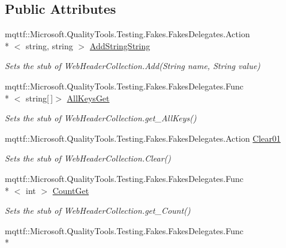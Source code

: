\subsection*{Public Attributes}
\begin{DoxyCompactItemize}
\item 
mqttf\-::\-Microsoft.\-Quality\-Tools.\-Testing.\-Fakes.\-Fakes\-Delegates.\-Action\\*
$<$ string, string $>$ \hyperlink{class_system_1_1_net_1_1_fakes_1_1_stub_web_header_collection_a314faa07f5206bd10fe602bde8762879}{Add\-String\-String}
\begin{DoxyCompactList}\small\item\em Sets the stub of Web\-Header\-Collection.\-Add(\-String name, String value)\end{DoxyCompactList}\item 
mqttf\-::\-Microsoft.\-Quality\-Tools.\-Testing.\-Fakes.\-Fakes\-Delegates.\-Func\\*
$<$ string\mbox{[}$\,$\mbox{]}$>$ \hyperlink{class_system_1_1_net_1_1_fakes_1_1_stub_web_header_collection_a41d29828607c8780b3ba6e64cf06d331}{All\-Keys\-Get}
\begin{DoxyCompactList}\small\item\em Sets the stub of Web\-Header\-Collection.\-get\-\_\-\-All\-Keys()\end{DoxyCompactList}\item 
mqttf\-::\-Microsoft.\-Quality\-Tools.\-Testing.\-Fakes.\-Fakes\-Delegates.\-Action \hyperlink{class_system_1_1_net_1_1_fakes_1_1_stub_web_header_collection_a852d4e4d0796d220068ceed1f832b283}{Clear01}
\begin{DoxyCompactList}\small\item\em Sets the stub of Web\-Header\-Collection.\-Clear()\end{DoxyCompactList}\item 
mqttf\-::\-Microsoft.\-Quality\-Tools.\-Testing.\-Fakes.\-Fakes\-Delegates.\-Func\\*
$<$ int $>$ \hyperlink{class_system_1_1_net_1_1_fakes_1_1_stub_web_header_collection_aa20d2599d688de64a71f61693fa17d98}{Count\-Get}
\begin{DoxyCompactList}\small\item\em Sets the stub of Web\-Header\-Collection.\-get\-\_\-\-Count()\end{DoxyCompactList}\item 
mqttf\-::\-Microsoft.\-Quality\-Tools.\-Testing.\-Fakes.\-Fakes\-Delegates.\-Func\\*

\end{DoxyCompactItemize}
